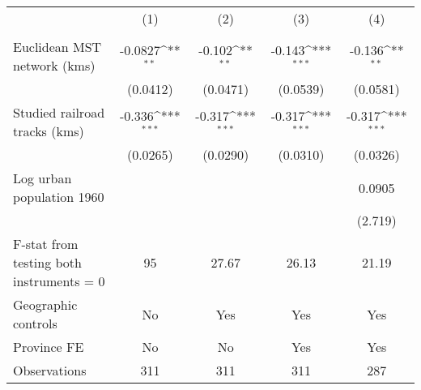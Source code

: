 {
\def\sym#1{\ifmmode^{#1}\else\(^{#1}\)\fi}
\begin{tabular}{l*{4}{c}}
\hline\hline
                &\multicolumn{1}{c}{(1)}&\multicolumn{1}{c}{(2)}&\multicolumn{1}{c}{(3)}&\multicolumn{1}{c}{(4)}\\
                &\multicolumn{1}{c}{}&\multicolumn{1}{c}{}&\multicolumn{1}{c}{}&\multicolumn{1}{c}{}\\
\hline
Euclidean MST network (kms)&  -0.0827\sym{**} &   -0.102\sym{**} &   -0.143\sym{***}&   -0.136\sym{**} \\
                & (0.0412)         & (0.0471)         & (0.0539)         & (0.0581)         \\
[1em]
Studied railroad tracks (kms)&   -0.336\sym{***}&   -0.317\sym{***}&   -0.317\sym{***}&   -0.317\sym{***}\\
                & (0.0265)         & (0.0290)         & (0.0310)         & (0.0326)         \\
[1em]
Log urban population 1960&                  &                  &                  &   0.0905         \\
                &                  &                  &                  &  (2.719)         \\
\hline
F-stat from testing both instruments = 0&       95         &    27.67         &    26.13         &    21.19         \\
Geographic controls&       No         &      Yes         &      Yes         &      Yes         \\
Province FE     &       No         &       No         &      Yes         &      Yes         \\
Observations    &      311         &      311         &      311         &      287         \\
\hline\hline
\end{tabular}
}

